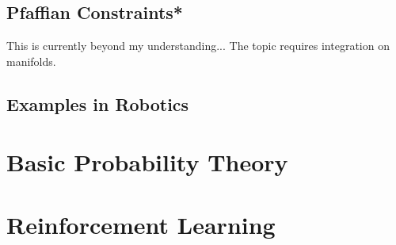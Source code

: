 \documentclass[10pt,letterpaper]{article} %
\begin{document}
\subsection{Pfaffian Constraints*}
This is currently beyond my understanding... The topic requires integration on manifolds.

\subsection{Examples in Robotics}

\section{Basic Probability Theory}

\section{Reinforcement Learning}

\end{document}
